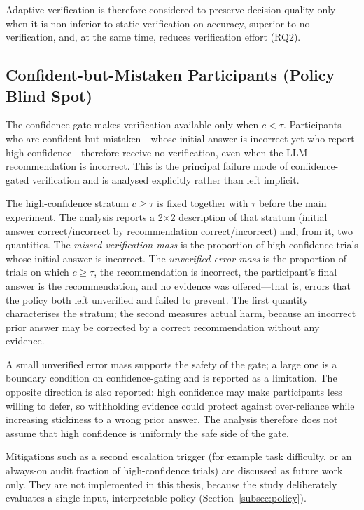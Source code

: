 \documentclass[oneside,final,14pt,a4paper]{extreport}
\begin{document}
Adaptive verification is therefore considered to preserve decision quality
only when it is non-inferior to static verification on accuracy, superior to
no verification, and, at the same time, reduces verification effort (RQ2).

\subsection{Confident-but-Mistaken Participants (Policy Blind Spot)}
\label{subsec:blindspot}

The confidence gate makes verification available only when $c<\tau$.
Participants who are confident but mistaken---whose initial answer is
incorrect yet who report high confidence---therefore receive no verification,
even when the LLM recommendation is incorrect. This is the principal failure
mode of confidence-gated verification and is analysed explicitly rather than
left implicit.

The high-confidence stratum $c\geq\tau$ is fixed together with $\tau$ before
the main experiment. The analysis reports a 2$\times$2 description of that
stratum (initial answer correct/incorrect by recommendation correct/incorrect)
and, from it, two quantities. The \emph{missed-verification mass} is the
proportion of high-confidence trials whose initial answer is incorrect. The
\emph{unverified error mass} is the proportion of trials on which
$c\geq\tau$, the recommendation is incorrect, the participant's final answer is
the recommendation, and no evidence was offered---that is, errors that the
policy both left unverified and failed to prevent. The first quantity
characterises the stratum; the second measures actual harm, because an
incorrect prior answer may be corrected by a correct recommendation without any
evidence.

A small unverified error mass supports the safety of the gate; a large one is
a boundary condition on confidence-gating and is reported as a limitation. The
opposite direction is also reported: high confidence may make participants
less willing to defer, so withholding evidence could protect against
over-reliance while increasing stickiness to a wrong prior answer. The
analysis therefore does not assume that high confidence is uniformly the safe
side of the gate.

Mitigations such as a second escalation trigger (for example task difficulty,
or an always-on audit fraction of high-confidence trials) are discussed as
future work only. They are not implemented in this thesis, because the study
deliberately evaluates a single-input, interpretable policy
(Section~\ref{subsec:policy}).
\end{document}
